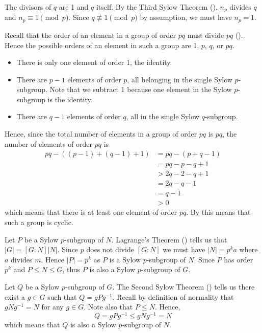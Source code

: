 \begin{questions}
\begin{partquestions}{\roman*}
        \item The divisors of $q$ are 1 and $q$ itself. By the Third Sylow Theorem (), $n_p$ divides $q$ and $n_p \equiv 1 \pmod p$. Since $q \not\equiv 1 \pmod p$ by assumption, we must have $n_p = 1$.

        Recall that the order of an element in a group of order $pq$ must divide $pq$ (). Hence the possible orders of an element in such a group are 1, $p$, $q$, or $pq$.
        \begin{itemize}
            \item There is only one element of order 1, the identity.
            \item There are $p - 1$ elements of order $p$, all belonging in the single Sylow $p$-subgroup. Note that we subtract 1 because one element in the Sylow $p$-subgroup is the identity.
            \item There are $q - 1$ elements of order $q$, all in the single Sylow $q$-subgroup.
        \end{itemize}
        Hence, since the total number of elements in a group of order $pq$ is $pq$, the number of elements of order $pq$ is
        \begin{align*}
            pq - \left((p-1)+(q-1)+1\right) &= pq - (p+q - 1)\\
            &= pq - p - q + 1\\
            &> 2q - 2 - q + 1\\
            &= 2q - q - 1\\
            &= q - 1\\
            &> 0
        \end{align*}
        which means that there is at least one element of order $pq$. By  this means that such a group is cyclic.
    \end{partquestions}

    \item \begin{partquestions}{\roman*}
        \item Let $P$ be a Sylow $p$-subgroup of $N$. Lagrange's Theorem () tells us that $|G| = [G:N]|N|$. Since $p$ does not divide $[G:N]$ we must have $|N| = p^ka$ where $a$ divides $m$. Hence $|P| = p^k$ as $P$ is a Sylow $p$-subgroup of $N$. Since $P$ has order $p^k$ and $P \leq N \leq G$, thus $P$ is also a Sylow $p$-subgroup of $G$.
        \item Let $Q$ be a Sylow $p$-subgroup of $G$. The Second Sylow Theorem () tells us there exist  a $g \in G$ such that $Q = gPg^{-1}$. Recall by definition of normality that $gNg^{-1} = N$ for any $g \in G$. Note also that $P \leq N$. Hence,
        \[
            Q = gPg^{-1} \leq gNg^{-1} = N
        \]
        which means that $Q$ is also a Sylow $p$-subgroup of $N$.
    \end{partquestions}


\end{questions}
